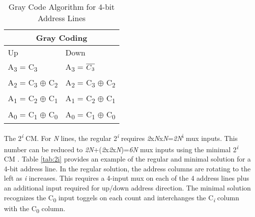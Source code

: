 \begin{table}[H]
  \centering
  \caption[Gray Code CM Algorithm]{Gray Code Algorithm for 4-bit Address Lines}
  \begin{tabular}{|l|l|}
    \hline
    \multicolumn{2}{|c|}{Gray Coding} \\
    \hline  
    Up & Down \\
    \hline
    A\textsubscript{3} = C\textsubscript{3}                           & A\textsubscript{3} = $\overline{C\textsubscript{3}}$              \\ %
    A\textsubscript{2} = C\textsubscript{3} $\oplus$ C\textsubscript{2} & A\textsubscript{2} = C\textsubscript{3} $\oplus$ C\textsubscript{2} \\ %
    A\textsubscript{1} = C\textsubscript{2} $\oplus$ C\textsubscript{1} & A\textsubscript{1} = C\textsubscript{2} $\oplus$ C\textsubscript{1} \\ %
    A\textsubscript{0} = C\textsubscript{1} $\oplus$ C\textsubscript{0} & A\textsubscript{0} = C\textsubscript{1} $\oplus$ C\textsubscript{0} \\ %
    \hline  
  \end{tabular}
  \label{tab:gc}
\end{table} 

The 2\textsuperscript{\textit{i}} CM. For \textit{N} lines, the regular
2\textsuperscript{\textit{i}} requires \textit{2}x\textit{N}x\textit{N}=\textit{2N}\textsuperscript{i} mux inputs.  This number can be reduced to \textit{2N}+(\textit{2}x\textit{2}x\textit{N})=\textit{6N} mux inputs using the minimal 2\textsuperscript{\textit{i}} CM \cite{5941430}.  Table \ref{tab:2i} provides an example of the regular and minimal solution for a 4-bit address line.  In the regular solution, the address columns are rotating to the left as \textit{i} increases.  This requires a 4-input mux on each of the 4 address lines plus an additional input required for up/down address direction.  The minimal solution recognizes the C\textsubscript{0} input toggels on each count and interchanges the C\textsubscript{\textit{i}} column with the C{\textsubscript{0}} column.


